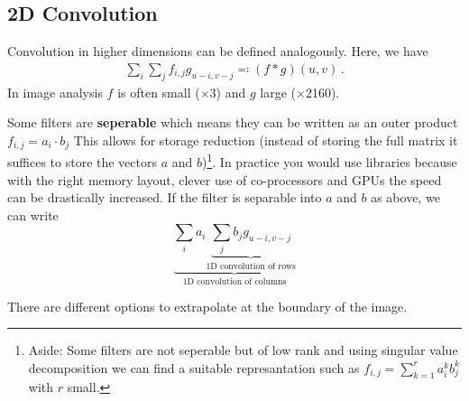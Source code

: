 \subsection*{2D Convolution}
Convolution in higher dimensions can be defined analogously. Here, we
have
\begin{gather*}
  \sum_i \sum_j f_{i,j}g_{u-i,v-j} \eqqcolon (f \ast g)(u,v)\,.
\end{gather*}
In image analysis $f$ is often small ($\times$3) and $g$ large
($\times$2160).

Some filters are \textbf{seperable} which means they can be written as
an outer product $f_{i,j} = a_i \cdot b_j$ This allows for storage
reduction (instead of storing the full matrix it suffices to store the
vectors $a$ and $b$)\footnote{Aside: Some filters are not seperable
  but of low rank and using singular value decomposition we can find a
  suitable represantation such as $f_{i,j} = \sum_{k=1}^r a_i^k b_j^k$
  with $r$ small.}. In practice you would use libraries because with
the right memory layout, clever use of co-processors and GPUs the
speed can be drastically increased. If the filter is separable into
$a$ and $b$ as above, we can write
\begin{equation*}
  \underbrace{
    \sum_i a_i \underbrace{
      \sum_j b_j g_{u-i,v-j}
    }_{\text{1D convolution of rows}}
  }_{\text{1D convolution of columns}}
\end{equation*}

There are different options to extrapolate at the boundary of the
image.


